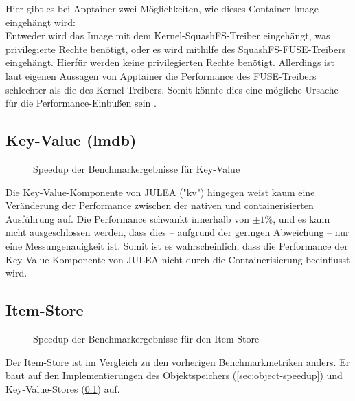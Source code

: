 Hier gibt es bei Apptainer zwei Möglichkeiten, wie dieses Container-Image eingehängt wird: \\
Entweder wird das Image mit dem Kernel-SquashFS-Treiber eingehängt, was privilegierte Rechte benötigt, oder es wird mithilfe des SquashFS-FUSE-Treibers eingehängt. Hierfür werden keine privilegierten Rechte benötigt. Allerdings ist laut eigenen Aussagen von Apptainer die Performance des FUSE-Treibers schlechter als die des Kernel-Treibers. Somit könnte dies eine mögliche Ursache für die Performance-Einbußen sein \cite{apptainerSecurityApptainerApptainer}.  

\subsection{Key-Value (lmdb)} \label{sec:kv-speedup}

\begin{figure}[H]
    \centering
    
    \caption{Speedup der Benchmarkergebnisse für Key-Value}
    \label{fig:speedup_kv}
\end{figure}

\FloatBarrier

Die Key-Value-Komponente von JULEA ("kv") hingegen weist kaum eine Veränderung der Performance zwischen der nativen und containerisierten Ausführung auf. Die Performance schwankt innerhalb von $\pm 1\%$, und es kann nicht ausgeschlossen werden, dass dies – aufgrund der geringen Abweichung – nur eine Messungenauigkeit ist. Somit ist es wahrscheinlich, dass die Performance der Key-Value-Komponente von JULEA nicht durch die Containerisierung beeinflusst wird.

\subsection{Item-Store}

\begin{figure}[H]
    \centering
    
    \caption{Speedup der Benchmarkergebnisse für den Item-Store}
    \label{fig:speedup_item}
\end{figure}

\FloatBarrier

Der Item-Store ist im Vergleich zu den vorherigen Benchmarkmetriken anders. Er baut auf den Implementierungen des Objektspeichers (\cref{sec:object-speedup}) und Key-Value-Stores (\cref{sec:kv-speedup}) auf.

